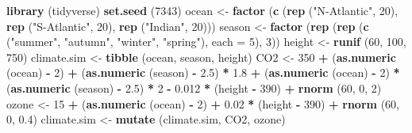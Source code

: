 \documentclass[
]{book}
\newenvironment{Shaded}{\begin{snugshade}}{\end{snugshade}}
\newcommand{\AttributeTok}[1]{\textcolor[rgb]{0.13,0.29,0.53}{#1}}
\newcommand{\DecValTok}[1]{\textcolor[rgb]{0.00,0.00,0.81}{#1}}
\newcommand{\FloatTok}[1]{\textcolor[rgb]{0.00,0.00,0.81}{#1}}
\newcommand{\FunctionTok}[1]{\textcolor[rgb]{0.13,0.29,0.53}{\textbf{#1}}}
\newcommand{\NormalTok}[1]{#1}
\newcommand{\OtherTok}[1]{\textcolor[rgb]{0.56,0.35,0.01}{#1}}
\newcommand{\SpecialCharTok}[1]{\textcolor[rgb]{0.81,0.36,0.00}{\textbf{#1}}}
\newcommand{\StringTok}[1]{\textcolor[rgb]{0.31,0.60,0.02}{#1}}
\begin{document}
\begin{Shaded}
\begin{Highlighting}[]
\FunctionTok{library}\NormalTok{ (tidyverse)}
\FunctionTok{set.seed}\NormalTok{ (}\DecValTok{7343}\NormalTok{)}
\NormalTok{ocean }\OtherTok{\textless{}{-}} \FunctionTok{factor}\NormalTok{ (}\FunctionTok{c}\NormalTok{ (}\FunctionTok{rep}\NormalTok{ (}\StringTok{"N{-}Atlantic"}\NormalTok{, }\DecValTok{20}\NormalTok{), }\FunctionTok{rep}\NormalTok{ (}\StringTok{"S{-}Atlantic"}\NormalTok{, }\DecValTok{20}\NormalTok{), }
                    \FunctionTok{rep}\NormalTok{ (}\StringTok{"Indian"}\NormalTok{, }\DecValTok{20}\NormalTok{)))}
\NormalTok{season }\OtherTok{\textless{}{-}} \FunctionTok{factor}\NormalTok{ (}\FunctionTok{rep}\NormalTok{ (}\FunctionTok{rep}\NormalTok{ (}\FunctionTok{c}\NormalTok{ (}\StringTok{"summer"}\NormalTok{, }\StringTok{"autumn"}\NormalTok{, }\StringTok{"winter"}\NormalTok{, }\StringTok{"spring"}\NormalTok{), }
                            \AttributeTok{each =} \DecValTok{5}\NormalTok{), }\DecValTok{3}\NormalTok{))}
\NormalTok{height }\OtherTok{\textless{}{-}} \FunctionTok{runif}\NormalTok{ (}\DecValTok{60}\NormalTok{, }\DecValTok{100}\NormalTok{, }\DecValTok{750}\NormalTok{)}
\NormalTok{climate.sim }\OtherTok{\textless{}{-}} \FunctionTok{tibble}\NormalTok{ (ocean, season, height)}
\NormalTok{CO2 }\OtherTok{\textless{}{-}} \DecValTok{350} \SpecialCharTok{+}\NormalTok{ (}\FunctionTok{as.numeric}\NormalTok{ (ocean) }\SpecialCharTok{{-}} \DecValTok{2}\NormalTok{) }\SpecialCharTok{+}\NormalTok{ (}\FunctionTok{as.numeric}\NormalTok{ (season) }\SpecialCharTok{{-}} \FloatTok{2.5}\NormalTok{) }\SpecialCharTok{*} \FloatTok{1.8} \SpecialCharTok{+} 
\NormalTok{       (}\FunctionTok{as.numeric}\NormalTok{ (ocean) }\SpecialCharTok{{-}} \DecValTok{2}\NormalTok{) }\SpecialCharTok{*}\NormalTok{ (}\FunctionTok{as.numeric}\NormalTok{ (season) }\SpecialCharTok{{-}} \FloatTok{2.5}\NormalTok{) }\SpecialCharTok{*} \DecValTok{2} \SpecialCharTok{{-}}
       \FloatTok{0.012} \SpecialCharTok{*}\NormalTok{ (height }\SpecialCharTok{{-}} \DecValTok{390}\NormalTok{) }\SpecialCharTok{+} \FunctionTok{rnorm}\NormalTok{ (}\DecValTok{60}\NormalTok{, }\DecValTok{0}\NormalTok{, }\DecValTok{2}\NormalTok{)}
\NormalTok{ozone }\OtherTok{\textless{}{-}} \DecValTok{15} \SpecialCharTok{+}\NormalTok{ (}\FunctionTok{as.numeric}\NormalTok{ (ocean) }\SpecialCharTok{{-}} \DecValTok{2}\NormalTok{) }\SpecialCharTok{+} \FloatTok{0.02} \SpecialCharTok{*}\NormalTok{ (height }\SpecialCharTok{{-}} \DecValTok{390}\NormalTok{) }\SpecialCharTok{+} 
         \FunctionTok{rnorm}\NormalTok{ (}\DecValTok{60}\NormalTok{, }\DecValTok{0}\NormalTok{, }\FloatTok{0.4}\NormalTok{)}
\NormalTok{climate.sim }\OtherTok{\textless{}{-}} \FunctionTok{mutate}\NormalTok{ (climate.sim, CO2, ozone)}
\end{Highlighting}
\end{Shaded}
\end{document}
